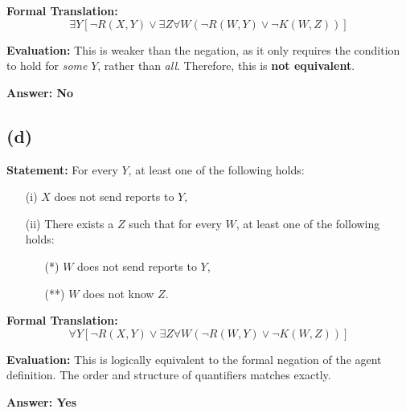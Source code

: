 \documentclass[12pt]{article}
\begin{document}
\textbf{Formal Translation:}
\begin{equation*}
    \exists Y \left[ \neg R(X,Y) \lor \exists Z \forall W ( \neg R(W,Y) \lor \neg K(W,Z) ) \right]
\end{equation*}

\textbf{Evaluation:} This is weaker than the negation, as it only requires the condition to hold for \emph{some} $Y$, rather than \emph{all}. Therefore, this is \textbf{not equivalent}.

\textbf{Answer: No}

\subsection*{(d)}
\textbf{Statement:} For every $Y$, at least one of the following holds:
\begin{itemize}
    \item[(i)] $X$ does not send reports to $Y$,
    \item[(ii)] There exists a $Z$ such that for every $W$, at least one of the following holds:
    \begin{itemize}
        \item[(*)] $W$ does not send reports to $Y$,
        \item[(**)] $W$ does not know $Z$.
    \end{itemize}
\end{itemize}

\textbf{Formal Translation:}
\begin{equation*}
    \forall Y \left[ \neg R(X,Y) \lor \exists Z \forall W ( \neg R(W,Y) \lor \neg K(W,Z) ) \right]
\end{equation*}

\textbf{Evaluation:} This is logically equivalent to the formal negation of the agent definition. The order and structure of quantifiers matches exactly.

\textbf{Answer: Yes}
\end{document}
